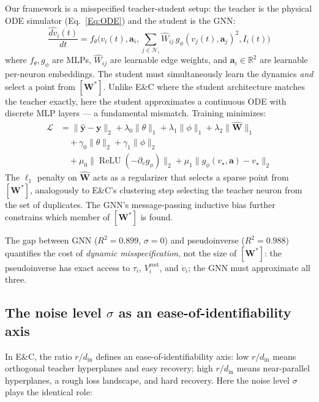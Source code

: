 \documentclass[11pt,a4paper]{article}
\begin{document}
Our framework is a misspecified teacher-student setup: the teacher is the physical
ODE simulator (Eq.~\ref{Eq:ODE}) and the student is the GNN:
\begin{equation}
\frac{\widehat{dv}_i(t)}{dt}
= f_\theta\!\Big(v_i(t),\mathbf{a}_i,
\sum_{j\in\mathcal{N}_i}\hat{W}_{ij}\,g_\phi(v_j(t),\mathbf{a}_j)^2,
I_i(t)\Big)
\end{equation}
where $f_\theta,g_\phi$ are MLPs, $\hat{W}_{ij}$ are learnable edge weights, and
$\mathbf{a}_i \in \mathbb{R}^2$ are learnable per-neuron embeddings. The student
must simultaneously learn the dynamics \emph{and} select a point from
$[\mathbf{W}^*]$. Unlike E\&C where the student architecture matches the teacher
exactly, here the student approximates a continuous ODE with discrete MLP
layers --- a fundamental mismatch. Training minimizes:
\begin{equation}
\begin{aligned}
\mathcal{L} &=
\|\widehat{\mathbf{y}}-\mathbf{y}\|_2
+ \lambda_0\|\theta\|_1 + \lambda_1\|\phi\|_1 + \lambda_2\|\hat{\mathbf{W}}\|_1 \\
&\quad + \gamma_0\|\theta\|_2 + \gamma_1\|\phi\|_2 \\
&\quad + \mu_0\|\operatorname{ReLU}(-\partial_v g_\phi)\|_2
       + \mu_1\|g_\phi(v_\star,\mathbf{a})-v_\star\|_2
\end{aligned}
\end{equation}
The $\ell_1$ penalty on $\hat{\mathbf{W}}$ acts as a regularizer that selects a
sparse point from $[\mathbf{W}^*]$, analogously to E\&C's clustering step
selecting the teacher neuron from the set of duplicates. The GNN's message-passing
inductive bias further constrains which member of $[\mathbf{W}^*]$ is found.

The gap between GNN ($R^2=0.899$, $\sigma=0$) and pseudoinverse ($R^2=0.988$)
quantifies the cost of \emph{dynamic misspecification}, not the size of
$[\mathbf{W}^*]$: the pseudoinverse has exact access to $\tau_i$, $V_i^{\text{rest}}$,
and $\dot{v}_i$; the GNN must approximate all three.

\subsection{The noise level $\sigma$ as an ease-of-identifiability axis}

In E\&C, the ratio $r/d_{\text{in}}$ defines an ease-of-identifiability axis:
low $r/d_{\text{in}}$ means orthogonal teacher hyperplanes and easy recovery; high
$r/d_{\text{in}}$ means near-parallel hyperplanes, a rough loss landscape, and
hard recovery. Here the noise level $\sigma$ plays the identical role:
\end{document}
